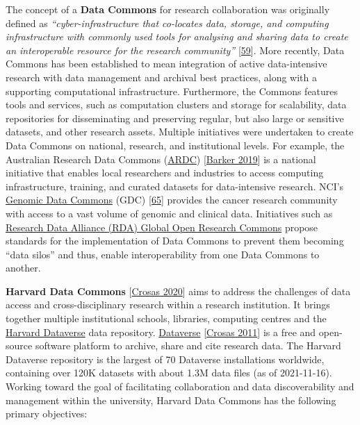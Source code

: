 The concept of a \textbf{Data Commons} for research collaboration was
originally defined as \emph{``cyber-infrastructure that co-locates data,
storage, and computing infrastructure with commonly used tools for
analysing and sharing data to create an interoperable resource for the
research community''}
{[}\href{https://doi.org/10.1109/MCSE.2016.92}{59}{]}. More recently,
Data Commons has been established to mean integration of active
data-intensive research with data management and archival best
practices, along with a supporting computational infrastructure.
Furthermore, the Commons features tools and services, such as
computation clusters and storage for scalability, data repositories for
disseminating and preserving regular, but also large or sensitive
datasets, and other research assets. Multiple initiatives were
undertaken to create Data Commons on national, research, and
institutional levels. For example, the Australian Research Data Commons
(\href{https://ardc.edu.au}{ARDC})
{[}\href{https://doi.org/10.5334/dsj-2019-044}{Barker 2019}{]} is a national
initiative that enables local researchers and industries to access
computing infrastructure, training, and curated datasets for
data-intensive research. NCI's \href{https://gdc.cancer.gov/}{Genomic
Data Commons} (GDC)
{[}\href{https://doi.org/10.1182/blood-2017-03-735654}{65}{]} provides
the cancer research community with access to a vast volume of genomic
and clinical data. Initiatives such as
\href{https://www.rd-alliance.org/groups/global-open-research-commons-ig}{Research
Data Alliance (RDA) Global Open Research Commons} propose standards for
the implementation of Data Commons to prevent them becoming ``data
silos'' and thus, enable interoperability from one Data Commons to
another.

\textbf{Harvard Data Commons}
{[}\href{https://doi.org/10.7557/5.5422}{Crosas 2020}{]} aims to address the
challenges of data access and cross-disciplinary research within a
research institution. It brings together multiple institutional schools,
libraries, computing centres and the
\href{https://dataverse.harvard.edu/}{Harvard Dataverse} data
repository. \href{https://dataverse.org/}{Dataverse}
{[}\href{https://doi.org/10.1045/january2011-crosas}{Crosas 2011}{]} is a free
and open-source software platform to archive, share and cite research
data. The Harvard Dataverse repository is the largest of 70 Dataverse
installations worldwide, containing over 120K datasets with about 1.3M
data files (as of 2021-11-16). Working toward the goal of facilitating
collaboration and data discoverability and management within the
university, Harvard Data Commons has the following primary objectives:

